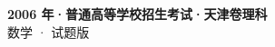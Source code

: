 \documentclass[zihao=-4, a4paper]{ctexart}
\begin{document}
\begin{center}
  {\Large\bfseries 2006 年·普通高等学校招生考试·天津卷理科}\\[4pt]
  {\large 数学 · 试题版}
\end{center}
\medskip
{}

\end{document}
